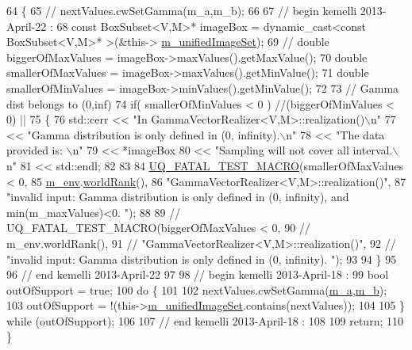 \begin{DoxyCode}
64 \{
65   \textcolor{comment}{// nextValues.cwSetGamma(m\_a,m\_b);}
66 
67 \textcolor{comment}{// begin kemelli 2013-April-22 :}
68   \textcolor{keyword}{const} BoxSubset<V,M>* imageBox = \textcolor{keyword}{dynamic\_cast<}\textcolor{keyword}{const }BoxSubset<V,M>* \textcolor{keyword}{>}(&this->
      \hyperlink{class_q_u_e_s_o_1_1_base_vector_realizer_a6c705235d28a3c12641da57cde948872}{m\_unifiedImageSet});
69 \textcolor{comment}{//  double biggerOfMaxValues = imageBox->maxValues().getMaxValue();}
70   \textcolor{keywordtype}{double} smallerOfMaxValues = imageBox->maxValues().getMinValue();      
71   \textcolor{keywordtype}{double} smallerOfMinValues = imageBox->minValues().getMinValue();
72   
73  \textcolor{comment}{// Gamma dist belongs to (0,inf)               }
74  \textcolor{keywordflow}{if}( smallerOfMinValues < 0 ) \textcolor{comment}{//(biggerOfMinValues < 0) || }
75  \{              
76    std::cerr << \textcolor{stringliteral}{"In GammaVectorRealizer<V,M>::realization()\(\backslash\)n"} 
77        << \textcolor{stringliteral}{"Gamma distribution is only defined in (0, infinity).\(\backslash\)n"}
78        << \textcolor{stringliteral}{"The data provided is: \(\backslash\)n"}
79        << *imageBox 
80          << \textcolor{stringliteral}{"Sampling will not cover all interval.\(\backslash\)n"}   
81          << std::endl;
82 
83 
84     \hyperlink{_defines_8h_a56d63d18d0a6d45757de47fcc06f574d}{UQ\_FATAL\_TEST\_MACRO}(smallerOfMaxValues < 0,
85                       \hyperlink{class_q_u_e_s_o_1_1_base_vector_realizer_acde246c52f82d8ed687d91cfac14c29c}{m\_env}.\hyperlink{class_q_u_e_s_o_1_1_base_environment_a78b57112bbd0e6dd0e8afec00b40ffa7}{worldRank}(),
86                       \textcolor{stringliteral}{"GammaVectorRealizer<V,M>::realization()"},
87                       \textcolor{stringliteral}{"invalid input: Gamma distribution is only defined in (0, infinity), and
       min(m\_maxValues)<0. "});      
88                       
89  \textcolor{comment}{//  UQ\_FATAL\_TEST\_MACRO(biggerOfMaxValues < 0,}
90  \textcolor{comment}{//                     m\_env.worldRank(),}
91  \textcolor{comment}{//                     "GammaVectorRealizer<V,M>::realization()",}
92  \textcolor{comment}{//                     "invalid input: Gamma distribution is only defined in (0, infinity). ");           
       }
93               
94  \}      
95 
96   \textcolor{comment}{// end kemelli 2013-April-22 }
97   
98   \textcolor{comment}{// begin kemelli 2013-April-18 : }
99   \textcolor{keywordtype}{bool} outOfSupport = \textcolor{keyword}{true};
100   \textcolor{keywordflow}{do} \{
101 
102   nextValues.cwSetGamma(\hyperlink{class_q_u_e_s_o_1_1_gamma_vector_realizer_a536756e884d641240015451f2f7a759c}{m\_a},\hyperlink{class_q_u_e_s_o_1_1_gamma_vector_realizer_a55e4d4fe511a6d63eaa98d6d6a7aaac5}{m\_b});
103   outOfSupport = !(this->\hyperlink{class_q_u_e_s_o_1_1_base_vector_realizer_a6c705235d28a3c12641da57cde948872}{m\_unifiedImageSet}.contains(nextValues));
104 
105   \} \textcolor{keywordflow}{while} (outOfSupport); 
106 
107   \textcolor{comment}{// end kemelli 2013-April-18 :}
108   
109   \textcolor{keywordflow}{return};
110 \}
\end{DoxyCode}



